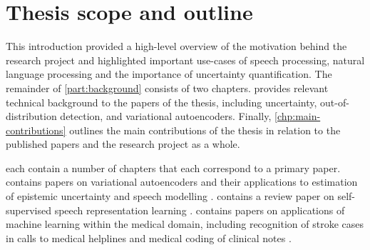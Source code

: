 \section{Thesis scope and outline}
%
%
%
This introduction provided a high-level overview of the motivation behind the research project and highlighted important use-cases of speech processing, natural language processing and the importance of uncertainty quantification. The remainder of \cref{part:background} consists of two chapters.  provides relevant technical background to the papers of the thesis, including uncertainty, out-of-distribution detection, and variational autoencoders. Finally, \cref{chp:main-contributions} outlines the main contributions of the thesis in relation to the published papers and the research project as a whole.

 each contain a number of chapters that each correspond to a primary paper.  contains papers on variational autoencoders and their applications to estimation of epistemic uncertainty and speech modelling \cite{havtorn_hierarchical_2021,havtorn_benchmarking_2022,bergamin_modelagnostic_2022}.  contains a review paper on self-supervised speech representation learning \cite{mohamed_selfsupervised_2022}.  contains papers on applications of machine learning within the medical domain, including recognition of stroke cases in calls to medical helplines \cite{wenstrup_retrospective_2023} and medical coding of clinical notes \cite{edin_automated_2023}. 

